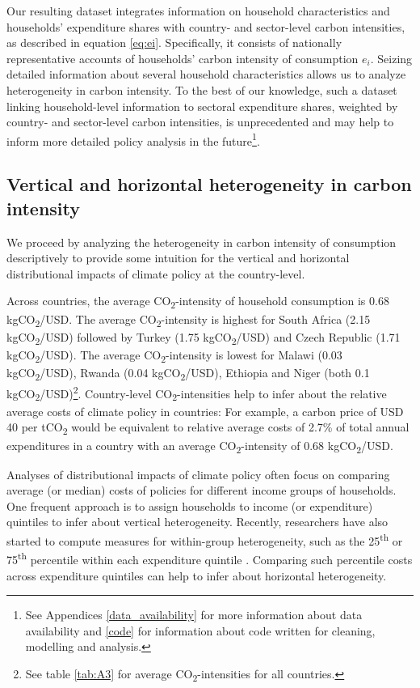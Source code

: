 \documentclass[12pt, a4paper]{article}
\begin{document}
Our resulting dataset integrates information on household characteristics and households' expenditure shares with country- and sector-level carbon intensities, as described in equation \ref{eq:ei}. Specifically, it consists of nationally representative accounts of households' carbon intensity of consumption $e_{i}$. Seizing detailed information about several household characteristics allows us to analyze heterogeneity in carbon intensity. To the best of our knowledge, such a dataset linking household-level information to sectoral expenditure shares, weighted by country- and sector-level carbon intensities, is unprecedented and may help to inform more detailed policy analysis in the future\footnote{See Appendices \ref{data_availability} for more information about data availability and \ref{code} for information about code written for cleaning, modelling and analysis.}.

\subsection{Vertical and horizontal heterogeneity in carbon intensity} \label{sec:descriptive}

We proceed by analyzing the heterogeneity in carbon intensity of consumption descriptively to provide some intuition for the vertical and horizontal distributional impacts of climate policy at the country-level.

Across countries, the average CO\textsubscript{2}-intensity of household consumption is 0.68 kgCO\textsubscript{2}/USD. The average CO\textsubscript{2}-intensity is highest for South Africa (2.15 kgCO\textsubscript{2}/USD) followed by Turkey (1.75 kgCO\textsubscript{2}/USD) and Czech Republic (1.71 kgCO\textsubscript{2}/USD). The average CO\textsubscript{2}-intensity is lowest for Malawi (0.03 kgCO\textsubscript{2}/USD), Rwanda (0.04 kgCO\textsubscript{2}/USD), Ethiopia and Niger (both 0.1 kgCO\textsubscript{2}/USD)\footnote{See table \ref{tab:A3} for average CO\textsubscript{2}-intensities for all countries.}. Country-level CO\textsubscript{2}-intensities help to infer about the relative average costs of climate policy in countries: For example, a carbon price of USD 40 per tCO\textsubscript{2} \autocite{Stiglitz.2017} would be equivalent to relative average costs of 2.7\% of total annual expenditures in a country with an average CO\textsubscript{2}-intensity of 0.68 kgCO\textsubscript{2}/USD.

Analyses of distributional impacts of climate policy often focus on comparing average (or median) costs of policies for different income groups of households. One frequent approach is to assign households to income (or expenditure) quintiles to infer about vertical heterogeneity. Recently, researchers have also started to compute measures for within-group heterogeneity, such as the 25\textsuperscript{th} or 75\textsuperscript{th} percentile within each expenditure quintile \autocite{Cronin.2019, Missbach.2024}. Comparing such percentile costs across expenditure quintiles can help to infer about horizontal heterogeneity.
\end{document}
